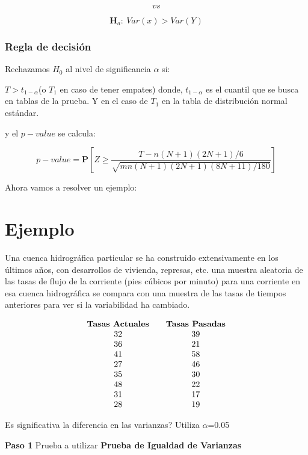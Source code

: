 \documentclass[
  a4paper,
  oneside,
  openany]{book}
\begin{document}
\[vs\]

\[\textbf{H}_a: \ Var(x) > Var(Y)\]

\hypertarget{regla-de-decisiuxf3n-19}{%
\subsubsection*{Regla de decisión}\label{regla-de-decisiuxf3n-19}}


Rechazamos \(H_0\) al nivel de significancia \(\alpha\) si:

\(T>t_{1-\alpha}\)(o \(T_1\) en caso de tener empates) donde, \(t_{1-\alpha}\) es el cuantil que se busca en tablas de la prueba. Y en el caso de \(T_{1}\) en la tabla de distribución normal estándar.

y el \(p-value\) se calcula:

\[p-value=\mathbf{P}\left[Z\geq\frac{T-n(N+1)(2N+1)/6}{\sqrt{mn(N+1)(2N+1)(8N+11)/180}}\right]\]

Ahora vamos a resolver un ejemplo:

\hypertarget{ejemplo-8}{%
\section{Ejemplo}\label{ejemplo-8}}

Una cuenca hidrográfica particular se ha construido extensivamente en los últimos años, con desarrollos de vivienda, represas, etc. una muestra aleatoria de las tasas de flujo de la corriente (pies cúbicos por minuto) para una corriente en esa cuenca hidrográfica se compara con una muestra de las tasas de tiempos anteriores para ver si la variabilidad ha cambiado.

\[
\begin{array}{c c c} 
\textbf{Tasas Actuales} &  & \textbf{Tasas Pasadas} \\
32 & & 39 \\
36 & & 21 \\
41 & & 58 \\
27 & & 46 \\
35 & & 30 \\
48 & & 22 \\
31 & & 17 \\
28 & & 19 \\
\end{array}
\]

Es significativa la diferencia en las varianzas? Utiliza \(\alpha\)=0.05

\textbf{Paso 1} Prueba a utilizar \textbf{Prueba de Igualdad de Varianzas}
\end{document}
